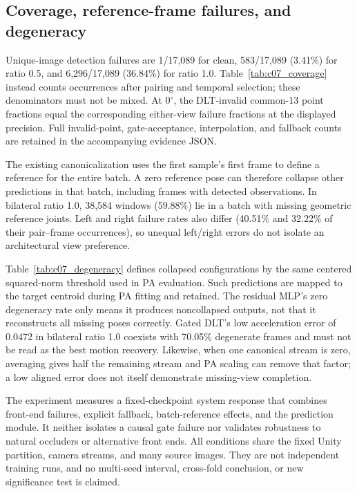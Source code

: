 
\FloatBarrier

\FloatBarrier

\FloatBarrier

\subsection{Coverage, reference-frame failures, and degeneracy}
Unique-image detection failures are 1/17,089 for clean, 583/17,089 (3.41\%) for ratio 0.5, and 6,296/17,089 (36.84\%) for ratio 1.0. Table~\ref{tab:c07_coverage} instead counts occurrences after pairing and temporal selection; these denominators must not be mixed. At $0^\circ$, the DLT-invalid common-13 point fractions equal the corresponding either-view failure fractions at the displayed precision. Full invalid-point, gate-acceptance, interpolation, and fallback counts are retained in the accompanying evidence JSON.



The existing canonicalization uses the first sample's first frame to define a reference for the entire batch. A zero reference pose can therefore collapse other predictions in that batch, including frames with detected observations. In bilateral ratio 1.0, 38,584 windows (59.88\%) lie in a batch with missing geometric reference joints. Left and right failure rates also differ (40.51\% and 32.22\% of their pair--frame occurrences), so unequal left/right errors do not isolate an architectural view preference.



Table~\ref{tab:c07_degeneracy} defines collapsed configurations by the same centered squared-norm threshold used in PA evaluation. Such predictions are mapped to the target centroid during PA fitting and retained. The residual MLP's zero degeneracy rate only means it produces noncollapsed outputs, not that it reconstructs all missing poses correctly. Gated DLT's low acceleration error of 0.0472 in bilateral ratio 1.0 coexists with 70.05\% degenerate frames and must not be read as the best motion recovery. Likewise, when one canonical stream is zero, averaging gives half the remaining stream and PA scaling can remove that factor; a low aligned error does not itself demonstrate missing-view completion.

The experiment measures a fixed-checkpoint system response that combines front-end failures, explicit fallback, batch-reference effects, and the prediction module. It neither isolates a causal gate failure nor validates robustness to natural occluders or alternative front ends. All conditions share the fixed Unity partition, camera streams, and many source images. They are not independent training runs, and no multi-seed interval, cross-fold conclusion, or new significance test is claimed.
\FloatBarrier
